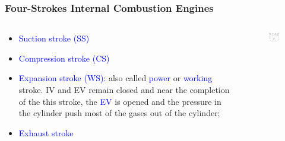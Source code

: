 \documentclass[10pt,compress]{beamer}
\begin{document}
\begin{frame}
 \frametitle{Four-Strokes Internal Combustion Engines}
  \begin{columns}
   \begin{column}[c]{0.4\linewidth}
    \begin{itemize}
     \item <1-> \textcolor{blue}{Suction stroke (SS)} 
     \item <1-> \textcolor{blue}{Compression stroke (CS)} 
     \item <1-> \textcolor{blue}{Expansion stroke (WS):} also called \textcolor{blue}{power} or \textcolor{blue}{working} stroke. IV and EV remain closed and near the completion of the this stroke, the \textcolor{blue}{EV} is opened and the pressure in the cylinder push most of the gases out of the cylinder;
     \item <2-> \textcolor{blue}{Exhaust stroke} 
    \end{itemize}
   \end{column}
   \begin{column}[c]{0.6\linewidth}
    \begin{figure}%
     \begin{center}
      \includegraphics[width=7.5cm,clip]{./Pics/InternalCombustion_4Strokes_Otto}
     \end{center}
    \end{figure}  
   \end{column}  
  \end{columns}
\end{frame}
\end{document}
